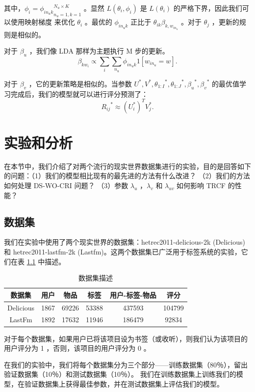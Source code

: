 其中，$\phi_i = {\phi_{in_uk}}_{n_u=1,k=1}^{N_u \times K}$ 。显然 $L(\theta_i, \phi_i)$ 是 $L(\theta_i)$ 的严格下界，因此我们可以使用映射梯度\cite{bertsekas1999nonlinear} 来优化 $\theta_i$ 。最优的 $\phi_{in_uk}$ 正比于 $\theta_{ik} \beta_{k,w_{in_u}}$ 。对于 $\theta_j$ ，更新的规则是相似的。

对于 $\beta_u$ ，我们像 LDA 那样为主题执行 M 步的更新。
$$
\beta_{kw_i} \propto \sum\limits_i \sum\limits_{n_u} \phi_{in_uk} 1 [w_{in_u} = w].
$$

对于 $\beta_v$ ，它的更新策略是相似的。当参数 $U^*, V^*, {\theta_{1:I}}^*,  {\theta_{1:J}}^* , {\beta_u}^*, {\beta_v}^*$ 的最优值学习完成后，我们的模型就可以进行评分预测了：
$$
{R_{ij}}^* \approx ({U_i^*})^T V_j^*.
$$


\chapter{实验和分析}
在本节中，我们介绍了对两个流行的现实世界数据集进行的实验，目的是回答如下的问题：（1）我们的模型相比现有的最先进的方法有什么改进？ （2）我们的方法如何处理 DS-WO-CRI 问题？ （3）参数 $\lambda_u$ ，$\lambda_v$ 和 $\lambda_{uv}$ 如何影响 TRCF 的性能？

\section{数据集}
我们在实验中使用了两个现实世界的数据集：hetrec2011-delicious-2k (Delicious) 和 hetrec2011-lastfm-2k (Lastfm)\cite{Cantador2011Second}。这两个数据集已广泛用于标签系统的实验\cite{Bellog2013A}，它们在表 \ref{table1} 中描述。

\begin{table}[]
\centering
\caption{数据集描述}
\label{table1}
\begin{tabular}{@{}cccccc@{}}
\toprule
数据集       & 用户   & 物品    & 标签    & 用户-标签-物品 & 评分     \\ \midrule
Delicious & 1867 & 69226 & 53388 & 437593   & 104799 \\
LastFm    & 1892 & 17632 & 11946 & 186479   & 92834  \\ \bottomrule
\end{tabular}
\end{table}

对于每个数据集，如果用户已将该项目设为书签（或收听），则我们认为该项目的用户评分为 1 ，否则，该项目的用户评分为 0 。

在我们的实验中，我们将每个数据集分为三个部分——训练数据集（80％），留出验证数据集（10％）和测试数据集（10％）。 我们在训练数据集上训练我们的模型，在验证数据集上获得最佳参数，并在测试数据集上评估我们的模型。

